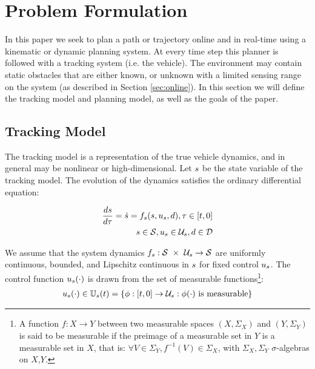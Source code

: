 \section{Problem Formulation \label{sec:formulation}}
In this paper we seek to plan a path or trajectory online and in real-time using a kinematic or dynamic planning system. At every time step this planner is followed with a tracking system (i.e. the vehicle). The environment may contain static obstacles that are either known, or unknown with a limited sensing range on the system (as described in Section \ref{sec:online}). In this section we will define the tracking model and planning model, as well as the goals of the paper.

\subsection{Tracking Model}
The tracking model is a representation of the true vehicle dynamics, and in general may be nonlinear or high-dimensional. Let $s$ be the state variable of the tracking model. The evolution of the dynamics satisfies the ordinary differential equation:

\begin{equation}
\begin{aligned}
\label{eq:tdyn}
\frac{ds}{d\tau} = \dot{s} = f_s(s, u_s, d), \tau \in [t, 0] \\
s \in \mathcal{S}, u_s \in \mathcal{U}_s, d \in \mathcal{D}
\end{aligned}
\end{equation}

We assume that the system dynamics $f_s : \mathcal{S}\ \times\ \mathcal{U}_s \rightarrow \mathcal{S}$ are uniformly continuous, bounded, and Lipschitz continuous in $s$ for fixed control $u_s$. The control function $u_s(\cdot)$ is drawn from the set of measurable functions\footnote{A function $f:X\to Y$ between two measurable spaces $(X,\Sigma_X)$ and $(Y,\Sigma_Y)$ is said to be measurable if the preimage of a measurable set in $Y$ is a measurable set in $X$, that is: $\forall V\in\Sigma_Y, f^{-1}(V)\in\Sigma_X$, with $\Sigma_X,\Sigma_Y$ $\sigma$-algebras on $X$,$Y$.}:
\begin{equation}
\begin{aligned}
u_s(\cdot) \in \mathbb{U}_s(t) = \{\phi: [t, 0] \rightarrow \mathcal{U}_s: \phi(\cdot) \text{ is measurable}\}
\end{aligned}
\end{equation}

